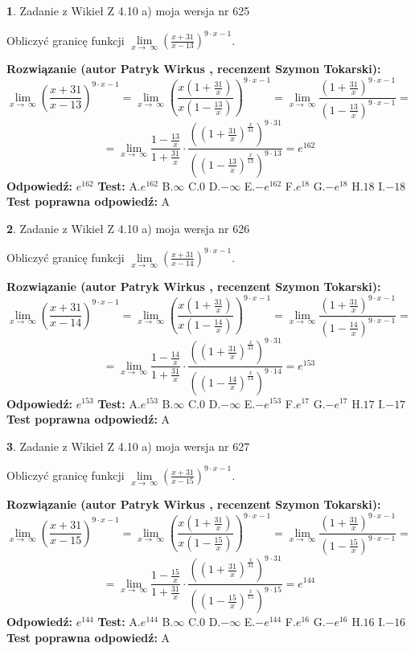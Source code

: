 \documentclass[12pt, a4paper]{article}
\theoremstyle{definition} %
\newtheorem{zad}{}
\newcommand{\zadStart}[1]{\begin{zad}#1\newline}
\newcommand{\zadStop}{\end{zad}}
\newcommand{\rozwStart}[2]{\noindent \textbf{Rozwiązanie (autor #1 , recenzent #2): }\newline}
\newcommand{\rozwStop}{\newline}
\newcommand{\odpStart}{\noindent \textbf{Odpowiedź:}\newline}
\newcommand{\odpStop}{\newline}
\newcommand{\testStart}{\noindent \textbf{Test:}\newline}
\newcommand{\testStop}{\newline}
\newcommand{\kluczStart}{\noindent \textbf{Test poprawna odpowiedź:}\newline}
\newcommand{\kluczStop}{\newline}
\begin{document}
\zadStart{Zadanie z Wikieł Z 4.10 a) moja wersja nr 625}

Obliczyć granicę funkcji  $\lim\limits_{x\to\ \infty}(\frac{x+31}{x-13})^{9\cdot x-1}$.
\zadStop
\rozwStart{Patryk Wirkus}{Szymon Tokarski}
$$\lim\limits_{x\to\ \infty}(\frac{x+31}{x-13})^{9\cdot x-1} = \lim\limits_{x\to\ \infty}(\frac{x(1+\frac{31}{x})}{x(1-\frac{13}{x})})^{9\cdot x-1}=\lim\limits_{x\to\ \infty}\frac{(1+\frac{31}{x})^{9\cdot x-1}}{(1-\frac{13}{x})^{9\cdot x-1}}=$$
$$=\lim\limits_{x\to\ \infty}\frac{1-\frac{13}{x}}{1+\frac{31}{x}}\cdot\frac{((1+\frac{31}{x})^{\frac{x}{31}})^{9\cdot31}}{((1-\frac{13}{x})^{\frac{x}{13}})^{9\cdot13}}=e^{162}$$
\rozwStop
\odpStart
$e^{162}$
\odpStop
\testStart
A.$e^{162}$ B.$\infty$ C.$0$ D.$-\infty$ E.$-e^{162}$
F.$e^{18}$ G.$-e^{18}$
H.$18$
I.$-18$
\testStop
\kluczStart
A
\kluczStop



\zadStart{Zadanie z Wikieł Z 4.10 a) moja wersja nr 626}

Obliczyć granicę funkcji  $\lim\limits_{x\to\ \infty}(\frac{x+31}{x-14})^{9\cdot x-1}$.
\zadStop
\rozwStart{Patryk Wirkus}{Szymon Tokarski}
$$\lim\limits_{x\to\ \infty}(\frac{x+31}{x-14})^{9\cdot x-1} = \lim\limits_{x\to\ \infty}(\frac{x(1+\frac{31}{x})}{x(1-\frac{14}{x})})^{9\cdot x-1}=\lim\limits_{x\to\ \infty}\frac{(1+\frac{31}{x})^{9\cdot x-1}}{(1-\frac{14}{x})^{9\cdot x-1}}=$$
$$=\lim\limits_{x\to\ \infty}\frac{1-\frac{14}{x}}{1+\frac{31}{x}}\cdot\frac{((1+\frac{31}{x})^{\frac{x}{31}})^{9\cdot31}}{((1-\frac{14}{x})^{\frac{x}{14}})^{9\cdot14}}=e^{153}$$
\rozwStop
\odpStart
$e^{153}$
\odpStop
\testStart
A.$e^{153}$ B.$\infty$ C.$0$ D.$-\infty$ E.$-e^{153}$
F.$e^{17}$ G.$-e^{17}$
H.$17$
I.$-17$
\testStop
\kluczStart
A
\kluczStop



\zadStart{Zadanie z Wikieł Z 4.10 a) moja wersja nr 627}

Obliczyć granicę funkcji  $\lim\limits_{x\to\ \infty}(\frac{x+31}{x-15})^{9\cdot x-1}$.
\zadStop
\rozwStart{Patryk Wirkus}{Szymon Tokarski}
$$\lim\limits_{x\to\ \infty}(\frac{x+31}{x-15})^{9\cdot x-1} = \lim\limits_{x\to\ \infty}(\frac{x(1+\frac{31}{x})}{x(1-\frac{15}{x})})^{9\cdot x-1}=\lim\limits_{x\to\ \infty}\frac{(1+\frac{31}{x})^{9\cdot x-1}}{(1-\frac{15}{x})^{9\cdot x-1}}=$$
$$=\lim\limits_{x\to\ \infty}\frac{1-\frac{15}{x}}{1+\frac{31}{x}}\cdot\frac{((1+\frac{31}{x})^{\frac{x}{31}})^{9\cdot31}}{((1-\frac{15}{x})^{\frac{x}{15}})^{9\cdot15}}=e^{144}$$
\rozwStop
\odpStart
$e^{144}$
\odpStop
\testStart
A.$e^{144}$ B.$\infty$ C.$0$ D.$-\infty$ E.$-e^{144}$
F.$e^{16}$ G.$-e^{16}$
H.$16$
I.$-16$
\testStop
\kluczStart
A
\kluczStop
\end{document}
